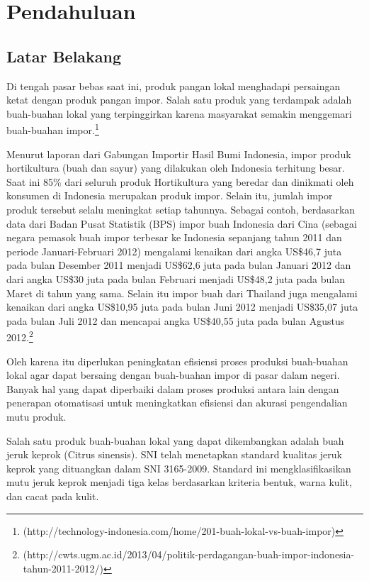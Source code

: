 \documentclass[laporan.tex]{subfiles}
\begin{document}
\chapter{Pendahuluan}

\section{Latar Belakang}

Di tengah pasar bebas saat ini, produk pangan lokal menghadapi persaingan ketat dengan produk pangan impor. Salah satu produk yang terdampak adalah buah-buahan lokal yang terpinggirkan karena masyarakat semakin menggemari buah-buahan impor.\footnote{(http://technology-indonesia.com/home/201-buah-lokal-vs-buah-impor)}

Menurut laporan dari Gabungan Importir Hasil Bumi Indonesia, impor produk hortikultura (buah dan sayur) yang dilakukan oleh Indonesia terhitung besar. Saat ini 85\% dari seluruh produk Hortikultura yang beredar dan dinikmati oleh konsumen di Indonesia merupakan produk impor. Selain itu, jumlah impor produk tersebut selalu meningkat setiap tahunnya. Sebagai contoh, berdasarkan data dari Badan Pusat Statistik (BPS) impor buah Indonesia dari Cina (sebagai negara pemasok buah impor terbesar ke Indonesia sepanjang tahun 2011 dan periode Januari‐Februari 2012) mengalami kenaikan dari angka US\$46,7 juta pada bulan Desember 2011 menjadi US\$62,6 juta pada bulan Januari 2012 dan dari angka US\$30 juta pada bulan Februari menjadi US\$48,2 juta pada bulan Maret di tahun yang sama. Selain itu impor buah dari Thailand juga mengalami kenaikan dari angka US\$10,95 juta pada bulan Juni 2012 menjadi US\$35,07 juta pada bulan Juli 2012 dan mencapai angka US\$40,55 juta pada bulan Agustus 2012.\footnote{(http://cwts.ugm.ac.id/2013/04/politik-perdagangan-buah-impor-indonesia-tahun-2011-2012/)}

Oleh karena itu diperlukan peningkatan efisiensi proses produksi buah-buahan lokal agar dapat bersaing dengan buah-buahan impor di pasar dalam negeri. Banyak hal yang dapat diperbaiki dalam proses produksi antara lain dengan penerapan otomatisasi untuk meningkatkan efisiensi dan akurasi pengendalian mutu produk.

Salah satu produk buah-buahan lokal yang dapat dikembangkan adalah buah jeruk keprok (Citrus sinensis). SNI telah menetapkan standard kualitas jeruk keprok yang dituangkan dalam SNI 3165-2009. Standard ini mengklasifikasikan mutu jeruk keprok menjadi tiga kelas berdasarkan kriteria  bentuk, warna kulit, dan cacat pada kulit.
\end{document}
